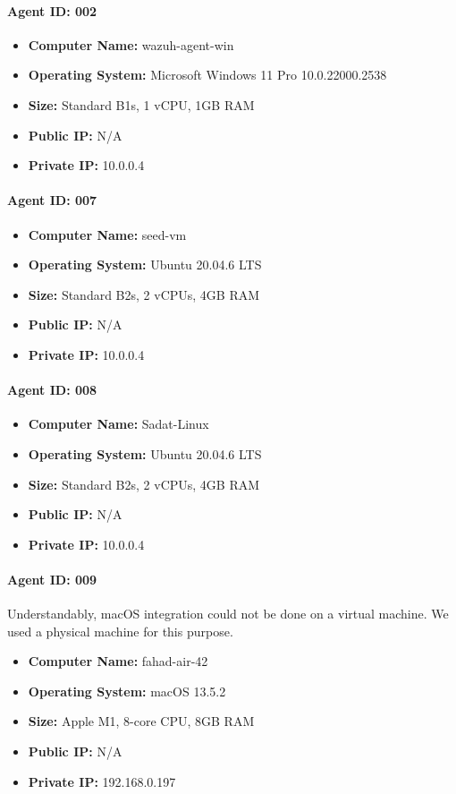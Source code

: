 \paragraph*{Agent ID: 002}
\begin{itemize}
    \item \textbf{Computer Name:} wazuh-agent-win
    \item \textbf{Operating System:} Microsoft Windows 11 Pro 10.0.22000.2538
    \item \textbf{Size:} Standard B1s, 1 vCPU, 1GB RAM
    \item \textbf{Public IP:} N/A
    \item \textbf{Private IP:} 10.0.0.4
\end{itemize}

\paragraph*{Agent ID: 007}
\begin{itemize}
    \item \textbf{Computer Name:} seed-vm
    \item \textbf{Operating System:} Ubuntu 20.04.6 LTS
    \item \textbf{Size:} Standard B2s, 2 vCPUs, 4GB RAM
    \item \textbf{Public IP:} N/A
    \item \textbf{Private IP:} 10.0.0.4
\end{itemize}


\paragraph*{Agent ID: 008}
\begin{itemize}
    \item \textbf{Computer Name:} Sadat-Linux
    \item \textbf{Operating System:} Ubuntu 20.04.6 LTS
    \item \textbf{Size:} Standard B2s, 2 vCPUs, 4GB RAM
    \item \textbf{Public IP:} N/A
    \item \textbf{Private IP:} 10.0.0.4
\end{itemize}

\paragraph*{Agent ID: 009}
Understandably, macOS integration could not be done on a virtual machine. We used a physical machine for this purpose.
\begin{itemize}
    \item \textbf{Computer Name:} fahad-air-42
    \item \textbf{Operating System:} macOS 13.5.2
    \item \textbf{Size:} Apple M1, 8-core CPU, 8GB RAM
    \item \textbf{Public IP:} N/A
    \item \textbf{Private IP:} 192.168.0.197
\end{itemize}

